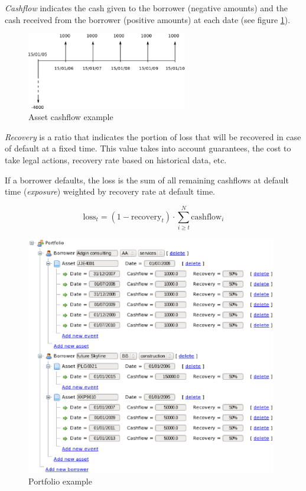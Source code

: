 \documentclass[a4paper,12pt,final]{article}
\begin{document}
\emph{Cashflow} indicates the cash given to the borrower (negative amounts) and the
cash received from the borrower (positive amounts) at each date (see figure \ref{cashflow}).

\begin{figure}[!hbt]
\begin{center}
\includegraphics[width=7cm, angle=0]{./images/cashflow.eps}
\caption{Asset cashflow example}
\label{cashflow}
\end{center}
\end{figure}
\FloatBarrier

\emph{Recovery} is a ratio that indicates the portion of loss that will be recovered
in case of default at a fixed time. This value takes into account guarantees, the 
cost to take legal actions, recovery rate based on historical data, etc.
\newline

If a borrower defaults, the loss is the sum of all remaining cashflows at default time 
(\emph{exposure}) weighted by recovery rate at default time.

\begin{displaymath}
\mathrm{loss}_{t} = (1 - \mathrm{recovery}_t) \cdot \sum_{i \ge t}^{N} \mathrm{cashflow}_{i}
\end{displaymath}

\begin{figure}[!hbt]
\begin{center}
\includegraphics[height=10.5cm, angle=0]{./images/portfolio.eps}
\caption{Portfolio example}
\label{portfolio}
\end{center}
\end{figure}
\FloatBarrier
\end{document}
